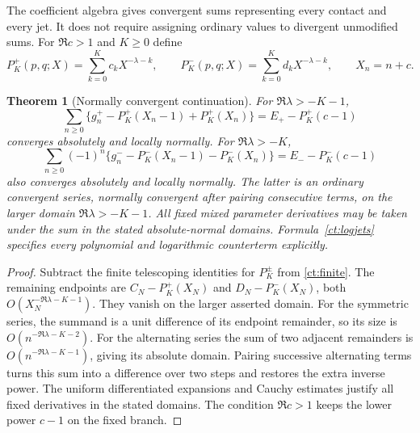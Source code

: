 \documentclass[11pt,letterpaper]{article}
\numberwithin{equation}{section}
\newtheorem{theorem}{Theorem}[section]
\theoremstyle{definition}
\theoremstyle{remark}
\begin{document}
The coefficient algebra gives convergent sums representing every contact
and every jet. It does not require assigning ordinary values to divergent
unmodified sums. For $\Re c>1$ and $K\ge0$ define
\begin{equation}\label{ct:PK}
 P_K^+(p,q;X)=\sum_{k=0}^Kc_kX^{-\lambda-k},\qquad
 P_K^-(p,q;X)=\sum_{k=0}^Kd_kX^{-\lambda-k},\qquad X_n=n+c.
\end{equation}

\begin{theorem}[Normally convergent continuation]\label{ct:normal}
For $\Re\lambda>-K-1$,
\begin{equation}\label{ct:normalplus}
 \sum_{n\ge0}\{g_n^+-P_K^+(X_n-1)+P_K^+(X_n)\}
             =E_+-P_K^+(c-1)
\end{equation}
converges absolutely and locally normally. For $\Re\lambda>-K$,
\begin{equation}\label{ct:normalminus}
 \sum_{n\ge0}(-1)^n\{g_n^--P_K^-(X_n-1)-P_K^-(X_n)\}
             =E_--P_K^-(c-1)
\end{equation}
also converges absolutely and locally normally. The latter is an ordinary
convergent series, normally convergent after pairing consecutive terms,
on the larger domain $\Re\lambda>-K-1$.
All fixed mixed parameter derivatives may be taken under the sum in the
stated absolute-normal domains. Formula~\eqref{ct:logjets} specifies
every polynomial and logarithmic counterterm explicitly.
\end{theorem}
\begin{proof}
Subtract the finite telescoping identities for $P_K^\pm$ from
\eqref{ct:finite}. The remaining endpoints are
$C_N-P_K^+(X_N)$ and $D_N-P_K^-(X_N)$, both
$O(X_N^{-\Re\lambda-K-1})$. They vanish on the larger asserted domain.
For the symmetric series, the summand is a unit difference of its endpoint
remainder, so its size is $O(n^{-\Re\lambda-K-2})$. For the alternating
series the sum of two adjacent remainders is
$O(n^{-\Re\lambda-K-1})$, giving its absolute domain. Pairing successive
alternating terms turns this sum into a difference over two steps and
restores the extra inverse power. The uniform differentiated expansions
and Cauchy estimates justify all fixed derivatives in the stated domains.
The condition $\Re c>1$ keeps the lower power $c-1$ on the fixed branch.
\end{proof}
\end{document}
